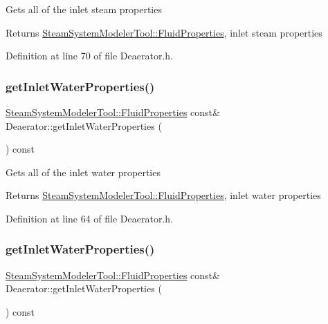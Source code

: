 Gets all of the inlet steam properties \begin{DoxyReturn}{Returns}
\hyperlink{struct_steam_system_modeler_tool_1_1_fluid_properties}{Steam\+System\+Modeler\+Tool\+::\+Fluid\+Properties}, inlet steam properties 
\end{DoxyReturn}


Definition at line 70 of file Deaerator.\+h.

\mbox{\label{class_deaerator_a9138c93cf6643e91ad7ce0de7fb328b7}} 
\subsubsection{\texorpdfstring{get\+Inlet\+Water\+Properties()}{getInletWaterProperties()}\hspace{0.1cm}{\footnotesize\ttfamily [1/3]}}
{\footnotesize\ttfamily \hyperlink{struct_steam_system_modeler_tool_1_1_fluid_properties}{Steam\+System\+Modeler\+Tool\+::\+Fluid\+Properties} const\& Deaerator\+::get\+Inlet\+Water\+Properties (\begin{DoxyParamCaption}{ }\end{DoxyParamCaption}) const\hspace{0.3cm}{\ttfamily [inline]}}

Gets all of the inlet water properties \begin{DoxyReturn}{Returns}
\hyperlink{struct_steam_system_modeler_tool_1_1_fluid_properties}{Steam\+System\+Modeler\+Tool\+::\+Fluid\+Properties}, inlet water properties 
\end{DoxyReturn}


Definition at line 64 of file Deaerator.\+h.

\mbox{\label{class_deaerator_a9138c93cf6643e91ad7ce0de7fb328b7}} 
\subsubsection{\texorpdfstring{get\+Inlet\+Water\+Properties()}{getInletWaterProperties()}\hspace{0.1cm}{\footnotesize\ttfamily [2/3]}}
{\footnotesize\ttfamily \hyperlink{struct_steam_system_modeler_tool_1_1_fluid_properties}{Steam\+System\+Modeler\+Tool\+::\+Fluid\+Properties} const\& Deaerator\+::get\+Inlet\+Water\+Properties (\begin{DoxyParamCaption}{ }\end{DoxyParamCaption}) const\hspace{0.3cm}{\ttfamily [inline]}}

